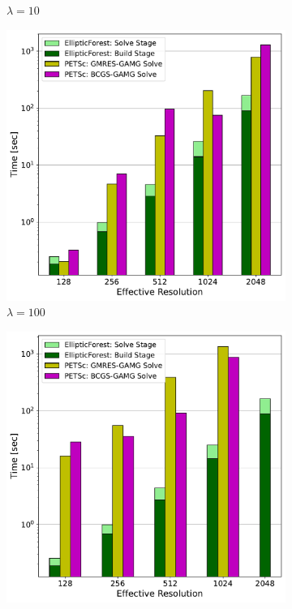 \begin{figure}
\begin{subfigure}[t]{0.48\textwidth}
        \caption{$\lambda = 10$}
    \end{subfigure}
    \begin{subfigure}[t]{0.48\textwidth}
        \includegraphics[width=1\textwidth, clip=true, trim={0 0 0 0}]{figures/case03-l100-stacked-bar-plot-comparisons-no-title.pdf}
        \caption{$\lambda = 100$}
    \end{subfigure}
    \begin{subfigure}[t]{0.48\textwidth}
        \includegraphics[width=1\textwidth, clip=true, trim={0 0 0 0}]{figures/case03-l1000-stacked-bar-plot-comparisons-no-title.pdf}

\end{subfigure}
\end{figure}
